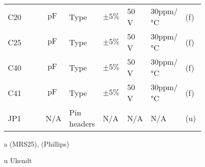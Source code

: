 \begin{table}[h!]
\begin{threeparttable}
\begin{tabular}{p{0.2\linewidth}p{0.1\linewidth}p{0.15\linewidth}p{0.05\linewidth}p{0.1\linewidth}p{0.1\linewidth}p{0.1\linewidth}}
C20 & $\SI{}{\pico\farad}$ & Type & $\pm 5\%$ & 50 \si{\volt} & 30ppm/\si{\celsius} & (f)\\
C25 & $\SI{}{\pico\farad}$ & Type & $\pm 5\%$ & 50 \si{\volt} & 30ppm/\si{\celsius} & (f)\\
C40 & $\SI{}{\pico\farad}$ & Type & $\pm 5\%$ & 50 \si{\volt} & 30ppm/\si{\celsius} & (f)\\
C41 & $\SI{}{\pico\farad}$ & Type & $\pm 5\%$ & 50 \si{\volt} & 30ppm/\si{\celsius} & (f)\\
\midrule
JP1 & N/A & Pin headers & N/A & N/A & N/A & (u) \\
\hline
\bottomrule
\end{tabular}
\begin{tablenotes}
\item[a] (MRS25), (Phillips)
\item[u] Ukendt
\end{tablenotes}
\end{threeparttable}
\end{table} 
